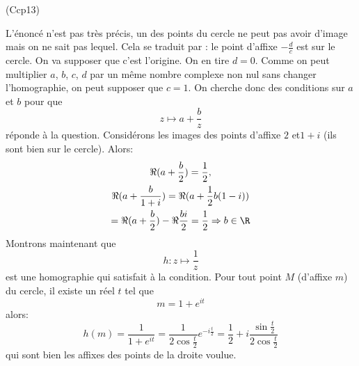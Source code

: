 \begin{tiny}(Ccp13)\end{tiny} L'énoncé n'est pas très précis, un des points du cercle ne peut pas avoir d'image mais on ne sait pas lequel. Cela se traduit par : le point d'affixe $-\frac{d}{c}$ est sur le cercle. \newline
On va supposer que c'est l'origine. On en tire $d=0$. Comme on peut multiplier $a$, $b$, $c$, $d$ par un même nombre complexe non nul sans changer l'homographie, on peut supposer que $c=1$.\newline
On cherche donc des conditions sur $a$ et $b$ pour que
\begin{displaymath}
  z \mapsto a + \frac{b}{z}
\end{displaymath}
réponde à la question.\newline
Considérons les images des points d'affixe $2$ et$1+i$ (ils sont bien sur le cercle). Alors:
\begin{multline*}
\Re(a+\frac{b}{2})=\frac{1}{2},\\
\Re(a+\frac{b}{1+i})= \Re(a+\frac{1}{2}b(1-i)) \\ 
= \Re(a+\frac{b}{2}) -\Re\frac{bi}{2} =\frac{1}{2}
\Rightarrow b \in \R
\end{multline*}
Montrons maintenant que
\begin{displaymath}
 h:  z \mapsto \frac{1}{z}
\end{displaymath}
est une homographie qui satisfait à la condition.\newline
Pour tout point $M$ (d'affixe $m$) du cercle, il existe un réel $t$ tel que
\begin{displaymath}
  m = 1+e^{it}
\end{displaymath}
alors:
\begin{displaymath}
  h(m)=\frac{1}{1+e^{it}} = \frac{1}{2\cos\frac{t}{2}}e^{-i\frac{t}{2}}
  = \frac{1}{2}+i\frac{\sin\frac{t}{2}}{2\cos\frac{t}{2}}
\end{displaymath}
qui sont bien les affixes des points de la droite voulue.